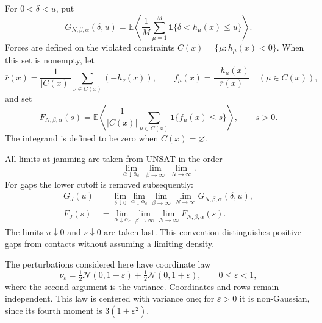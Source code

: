 \documentclass[11pt,a4paper]{article}
\numberwithin{equation}{section}
\theoremstyle{definition}
\theoremstyle{remark}
\newcommand{\E}{\mathbb E}
\newcommand{\ind}{\mathbf 1}
\newcommand{\cN}{\mathcal N}
\newcommand{\eps}{\varepsilon}
\begin{document}
For $0<\delta<u$, put
\begin{equation}\label{eq:intro-gap-observable}
 G_{N,\beta,\alpha}(\delta,u)
 =\E\left\langle\frac1M\sum_{\mu=1}^M
       \ind\{\delta<h_\mu(x)\le u\}\right\rangle.
\end{equation}
Forces are defined on the violated constraints
$C(x)=\{\mu:h_\mu(x)<0\}$. When this set is nonempty, let
\[
 \overline r(x)=\frac1{|C(x)|}\sum_{\nu\in C(x)}(-h_\nu(x)),
 \qquad f_\mu(x)=\frac{-h_\mu(x)}{\overline r(x)}\quad(\mu\in C(x)),
\]
and set
\begin{equation}\label{eq:intro-force-observable}
 F_{N,\beta,\alpha}(s)=
 \E\left\langle\frac1{|C(x)|}\sum_{\mu\in C(x)}
             \ind\{f_\mu(x)\le s\}\right\rangle,\qquad s>0.
\end{equation}
The integrand is defined to be zero when $C(x)=\varnothing$.

All limits at jamming are taken from UNSAT in the order
\begin{equation}\label{eq:intro-order}
 \lim_{\alpha\downarrow\alpha_c}\ \lim_{\beta\to\infty}\ \lim_{N\to\infty}.
\end{equation}
For gaps the lower cutoff is removed subsequently:
\begin{align}
 G_J(u)&=\lim_{\delta\downarrow0}
          \lim_{\alpha\downarrow\alpha_c}
          \lim_{\beta\to\infty}\lim_{N\to\infty}
          G_{N,\beta,\alpha}(\delta,u),\label{eq:intro-GJ}\\
 F_J(s)&=\lim_{\alpha\downarrow\alpha_c}
          \lim_{\beta\to\infty}\lim_{N\to\infty}
          F_{N,\beta,\alpha}(s).\label{eq:intro-FJ}
\end{align}
The limits $u\downarrow0$ and $s\downarrow0$ are taken last. This convention distinguishes positive gaps from contacts without assuming a limiting density.

The perturbations considered here have coordinate law
\begin{equation}\label{eq:intro-mixture}
 \nu_\eps=\tfrac12\cN(0,1-\eps)+\tfrac12\cN(0,1+\eps),\qquad 0\le\eps<1,
\end{equation}
where the second argument is the variance. Coordinates and rows remain independent.
This law is centered with variance one; for $\eps>0$ it is non-Gaussian,
since its fourth moment is $3(1+\eps^2)$.
\end{document}
